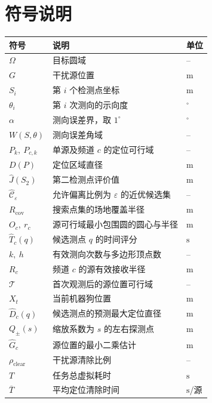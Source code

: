 \documentclass[withoutpreface,bwprint]{cumcmthesis} %
\begin{document}
\newpage

\section{符号说明}

\begin{table}[htbp]
  \centering
  \renewcommand{\arraystretch}{1.25}
  \setlength{\tabcolsep}{8pt}
  \begin{tabularx}{\textwidth}{
    >{\centering\arraybackslash}p{}
    >{\centering\arraybackslash}X
    >{\centering\arraybackslash}p{}
  }
    \toprule
    符号 & 说明 & 单位 \\
    \midrule
    $\Omega$ & 目标圆域 & -- \\
    $G$ & 干扰源位置 & $\mathrm{m}$ \\
    $S_i$ & 第 $i$ 个检测点坐标 & $\mathrm{m}$ \\
    $\theta_i$ & 第 $i$ 次测向的示向度 & ${}^\circ$ \\
    $\alpha$ & 测向误差界，取 $1^\circ$ & ${}^\circ$ \\
    $W(S,\theta)$ & 测向误差角域 & -- \\
    $P_k,\ P_{c,k}$ & 单源及频道 $c$ 的定位可行域 & -- \\
    $D(P)$ & 定位区域直径 & $\mathrm{m}$ \\
    $\widehat J(S_2)$ & 第二检测点评价值 & $\mathrm{m}$ \\
    $\widehat{\mathcal C}_{\varepsilon}$
      & 允许偏离比例为 $\varepsilon$ 的近优候选集 & -- \\
    $R_{\mathrm{cov}}$ & 搜索点集的场地覆盖半径 & $\mathrm{m}$ \\
    $O_c,\ r_c$ & 源可行域最小包围圆的圆心与半径 & $\mathrm{m}$ \\
    $\widehat T_c(q)$ & 候选测点 $q$ 的时间评分 & $\mathrm{s}$ \\
        $k,\ h$ & 有效测向次数与多边形顶点数 & -- \\
    $R_c$ & 频道 $c$ 的源有效接收半径 & $\mathrm{m}$ \\
    $\mathcal T$ & 首次观测后的源位置可行域 & -- \\
    $X_t$ & 当前机器狗位置 & $\mathrm{m}$ \\
    $\widehat D_c(q)$ & 候选测点的预测最大定位直径 & $\mathrm{m}$ \\
    $Q_{\pm}(s)$ & 缩放系数为 $s$ 的左右探测点 & $\mathrm{m}$ \\
    $\widehat G_c$ & 源位置的最小二乘估计 & $\mathrm{m}$ \\
    $\rho_{\mathrm{clear}}$ & 干扰源清除比例 & -- \\
    $T$ & 任务总虚拟耗时 & $\mathrm{s}$ \\
    $\overline T$ & 平均定位清除时间 & $\mathrm{s}$/源 \\
    \bottomrule
  \end{tabularx}
\end{table}
\end{document}
